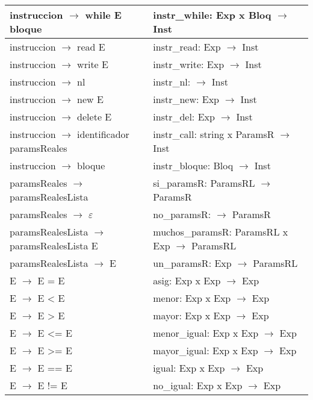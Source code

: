 \documentclass[11pt]{article}
\begin{document}
\begin{center}
\begin{longtable}{|p{7cm}|p{7cm}|}
        \hline
        instruccion $\rightarrow$ while E bloque & instr\_while: Exp x Bloq $\rightarrow$ Inst \\
        \hline
        instruccion $\rightarrow$ read E & instr\_read: Exp $\rightarrow$ Inst \\
        \hline
        instruccion $\rightarrow$ write E & instr\_write: Exp $\rightarrow$ Inst \\
        \hline
        instruccion $\rightarrow$ nl & instr\_nl: $\rightarrow$ Inst \\
        \hline
        instruccion $\rightarrow$ new E & instr\_new: Exp $\rightarrow$ Inst \\
        \hline
        instruccion $\rightarrow$ delete E & instr\_del: Exp $\rightarrow$ Inst \\
        \hline
        instruccion $\rightarrow$ identificador paramsReales & instr\_call: string x ParamsR $\rightarrow$ Inst \\
        \hline
        instruccion $\rightarrow$ bloque & instr\_bloque: Bloq $\rightarrow$ Inst \\
        \hline
        paramsReales $\rightarrow$ paramsRealesLista & si\_paramsR: ParamsRL $\rightarrow$ ParamsR \\
        \hline
        paramsReales $\rightarrow$ $\varepsilon$ & no\_paramsR: $\rightarrow$ ParamsR \\
        \hline
        paramsRealesLista $\rightarrow$ paramsRealesLista E & muchos\_paramsR: ParamsRL x Exp $\rightarrow$ ParamsRL \\
        \hline
        paramsRealesLista $\rightarrow$ E & un\_paramsR: Exp $\rightarrow$ ParamsRL \\
        \hline
        E $\rightarrow$ E = E & asig: Exp x Exp $\rightarrow$ Exp \\
        \hline
        E $\rightarrow$ E < E & menor: Exp x Exp $\rightarrow$ Exp \\
        \hline
        E $\rightarrow$ E > E & mayor: Exp x Exp $\rightarrow$ Exp \\
        \hline
        E $\rightarrow$ E <= E & menor\_igual: Exp x Exp $\rightarrow$ Exp \\
        \hline
        E $\rightarrow$ E >= E & mayor\_igual: Exp x Exp $\rightarrow$ Exp \\
        \hline
        E $\rightarrow$ E == E & igual: Exp x Exp $\rightarrow$ Exp \\
        \hline
        E $\rightarrow$ E != E & no\_igual: Exp x Exp $\rightarrow$ Exp \\

\end{longtable}
\end{center}
\end{document}
